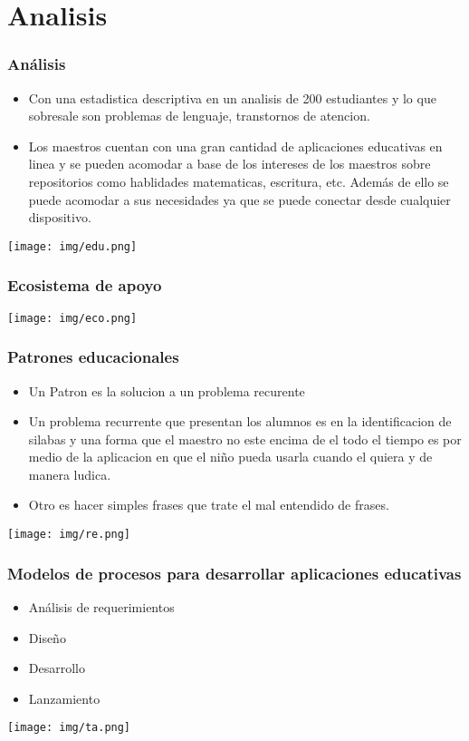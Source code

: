 \documentclass[11pt]{beamer}
\begin{document}
\section{Analisis}
\begin{frame}
\frametitle{Análisis}
\begin{itemize}
\item Con una estadistica descriptiva en un analisis de 200 estudiantes y lo que sobresale son problemas de lenguaje, transtornos de atencion.
\item Los maestros cuentan con una gran cantidad de aplicaciones educativas en linea y se pueden acomodar a base de los intereses de los maestros sobre repositorios como hablidades matematicas, escritura, etc. 
Además de ello se puede acomodar a sus necesidades ya que se puede conectar desde cualquier dispositivo.
\end{itemize}
\centering
{\texttt{[image: img/edu.png]}}
\end{frame}
\begin{frame}
\frametitle{Ecosistema de apoyo}

{\texttt{[image: img/eco.png]}}


\end{frame}




\begin{frame}
\frametitle{Patrones educacionales}
\begin{itemize}
\item Un Patron es la solucion a un problema recurente
\item  Un problema recurrente que presentan los alumnos es en la identificacion de silabas y una forma que el maestro no este encima de el todo el tiempo es por medio de la aplicacion en que el niño pueda usarla cuando el quiera y de manera ludica.
\item Otro es hacer simples frases que trate el mal entendido de frases.

\end{itemize}
\centering
{\texttt{[image: img/re.png]}}
\end{frame}
\begin{frame}
\frametitle{Modelos de procesos para desarrollar aplicaciones educativas}
\begin{itemize}
\item Análisis de requerimientos
\item Diseño
\item Desarrollo
\item Lanzamiento

\end{itemize}
\centering
{\texttt{[image: img/ta.png]}}
\end{frame}
\end{document}
